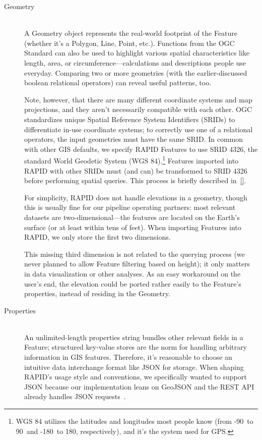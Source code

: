 \begin{description}
  \item[Geometry] \hfill \\
  A Geometry object represents the real-world footprint of the Feature (whether it's a Polygon, Line, Point, etc.). Functions from the OGC Standard can also be used to highlight various spatial characteristics like length, area, or circumference---calculations and descriptions people use everyday. Comparing two or more geometries (with the earlier-discussed boolean relational operators) can reveal useful patterns, too.
  
  Note, however, that there are many different coordinate systems and map projections, and they aren't necessarily compatible with each other. OGC standardizes unique Spatial Reference System Identifiers (SRIDs) to differentiate in-use coordinate systems; to correctly use one of a relational operators, the input geometries must have the same SRID. In common with other GIS defaults, we specify RAPID Features to use SRID 4326, the standard World Geodetic System (WGS 84).\footnote{WGS 84 utilizes the latitudes and longitudes most people know (from -90\textdegree~to 90\textdegree~and -180\textdegree~to 180\textdegree, respectively), and it's the system used for GPS.} Features imported into RAPID with other SRIDs must (and can) be transformed to SRID 4326 before performing spatial queries. This process is briefly described in~\ref{}.
   
   For simplicity, RAPID does not handle elevations in a geometry, though this is usually fine for our pipeline operating partners: most relevant datasets are two-dimensional---the features are located on the Earth's surface (or at least within tens of feet). When importing Features into RAPID, we only store the first two dimensions.
   
   This missing third dimension is not related to the querying process (we never planned to allow Feature filtering based on height); it only matters in data visualization or other analyses. As an easy workaround on the user's end, the elevation could be ported rather easily to the Feature's properties, instead of residing in the Geometry.
  
  \item[Properties] \hfill \\
  An unlimited-length properties string bundles other relevant fields in a Feature; structured key-value stores are the norm for handling arbitrary information in GIS features. Therefore, it's reasonable to choose an intuitive data interchange format like JSON for storage. When shaping RAPID's usage style and conventions, we specifically wanted to support JSON because our implementation leans on GeoJSON and the REST API already handles JSON requests~\cite{alexa}.
  

\end{description}
